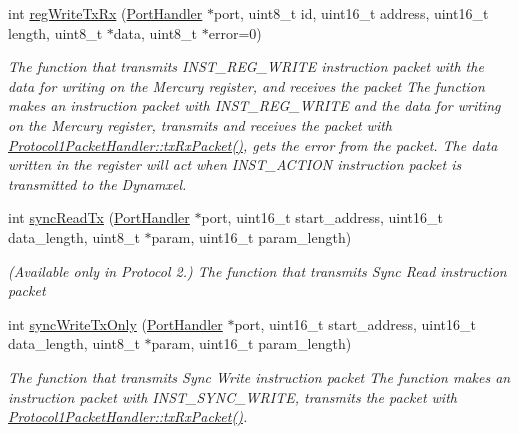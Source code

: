 \begin{DoxyCompactItemize}
int \hyperlink{classmercury_1_1_protocol1_packet_handler_a1d3465f477895b2255b5bc9ddddf9e3b}{reg\+Write\+Tx\+Rx} (\hyperlink{classmercury_1_1_port_handler}{Port\+Handler} $\ast$port, uint8\+\_\+t id, uint16\+\_\+t address, uint16\+\_\+t length, uint8\+\_\+t $\ast$data, uint8\+\_\+t $\ast$error=0)
\begin{DoxyCompactList}\small\item\em The function that transmits I\+N\+S\+T\+\_\+\+R\+E\+G\+\_\+\+W\+R\+I\+TE instruction packet with the data for writing on the Mercury register, and receives the packet  The function makes an instruction packet with I\+N\+S\+T\+\_\+\+R\+E\+G\+\_\+\+W\+R\+I\+TE and the data for writing on the Mercury register,  transmits and receives the packet with \hyperlink{classmercury_1_1_protocol1_packet_handler_ae488c4554064d6dd0ccabb9d2410e8f0}{Protocol1\+Packet\+Handler\+::tx\+Rx\+Packet()},  gets the error from the packet.  The data written in the register will act when I\+N\+S\+T\+\_\+\+A\+C\+T\+I\+ON instruction packet is transmitted to the Dynamxel. \end{DoxyCompactList}\item 
int \hyperlink{classmercury_1_1_protocol1_packet_handler_a6f101ec590ea6f300c563c536c7759d0}{sync\+Read\+Tx} (\hyperlink{classmercury_1_1_port_handler}{Port\+Handler} $\ast$port, uint16\+\_\+t start\+\_\+address, uint16\+\_\+t data\+\_\+length, uint8\+\_\+t $\ast$param, uint16\+\_\+t param\+\_\+length)
\begin{DoxyCompactList}\small\item\em (Available only in Protocol 2.) The function that transmits Sync Read instruction packet \end{DoxyCompactList}\item 
int \hyperlink{classmercury_1_1_protocol1_packet_handler_a53d5cfbbae7b9184e4c51051f1b426d1}{sync\+Write\+Tx\+Only} (\hyperlink{classmercury_1_1_port_handler}{Port\+Handler} $\ast$port, uint16\+\_\+t start\+\_\+address, uint16\+\_\+t data\+\_\+length, uint8\+\_\+t $\ast$param, uint16\+\_\+t param\+\_\+length)
\begin{DoxyCompactList}\small\item\em The function that transmits Sync Write instruction packet  The function makes an instruction packet with I\+N\+S\+T\+\_\+\+S\+Y\+N\+C\+\_\+\+W\+R\+I\+TE,  transmits the packet with \hyperlink{classmercury_1_1_protocol1_packet_handler_ae488c4554064d6dd0ccabb9d2410e8f0}{Protocol1\+Packet\+Handler\+::tx\+Rx\+Packet()}. \end{DoxyCompactList}\item 

\end{DoxyCompactItemize}
